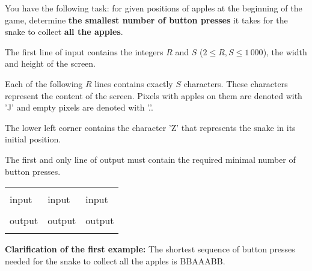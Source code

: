 You have the following task: for given positions of apples at the beginning of the game, determine \textbf{the smallest number of button presses} it takes for the snake to collect \textbf{all the apples}.

\strut


The first line of input contains the integers $R$ and $S$ ($2 \leqslant R, S \leqslant 1\,000$), the width and height of the screen.

Each of the following $R$ lines contains exactly $S$ characters. These characters represent the content of the screen. Pixels with apples on them are denoted with 'J' and empty pixels are denoted with '.'.

The lower left corner contains the character 'Z' that represents the snake in its initial position.

\strut


The first and only line of output must contain the required minimal number of button presses.

\strut


\begin{center}
\fontfamily{\ttdefault}
\fontsize{10pt}{1em}
\selectfont
\begin{tabu}to 0.99\textwidth{|X[1]|X[1]|X[1]|}
\hline
& & \\ 
\rowfont{\fontsize{10pt}{1em}\bfseries}
input & input & input\\
 &
 & 
 \\
\rowfont{\fontsize{10pt}{1em}\bfseries}
output & output & output\\
 &
 & 
 \\
\hline
\end{tabu}
\end{center}

{
\fontsize{10pt}{1em}
\selectfont
\textbf{Clarification of the first example:} The shortest sequence of button presses needed for the snake to collect all the apples is BBAAABB. \\
}